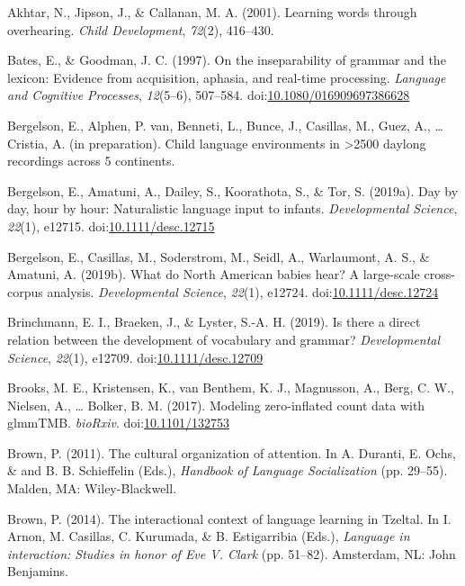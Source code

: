 \documentclass[,man,floatsintext]{apa6}
\begin{document}
\hypertarget{ref-akhtar2001learning}{}
Akhtar, N., Jipson, J., \& Callanan, M. A. (2001). Learning words
through overhearing. \emph{Child Development}, \emph{72}(2), 416--430.

\hypertarget{ref-bates1997inseparability}{}
Bates, E., \& Goodman, J. C. (1997). On the inseparability of grammar
and the lexicon: Evidence from acquisition, aphasia, and real-time
processing. \emph{Language and Cognitive Processes}, \emph{12}(5--6),
507--584.
doi:\href{https://doi.org/10.1080/016909697386628}{10.1080/016909697386628}

\hypertarget{ref-bergelsonIPbsl}{}
Bergelson, E., Alphen, P. van, Benneti, L., Bunce, J., Casillas, M.,
Guez, A., \ldots{} Cristia, A. (in preparation). Child language
environments in \textgreater{}2500 daylong recordings across 5
continents.

\hypertarget{ref-bergelson2019day}{}
Bergelson, E., Amatuni, A., Dailey, S., Koorathota, S., \& Tor, S.
(2019a). Day by day, hour by hour: Naturalistic language input to
infants. \emph{Developmental Science}, \emph{22}(1), e12715.
doi:\href{https://doi.org/10.1111/desc.12715}{10.1111/desc.12715}

\hypertarget{ref-bergelsoncasillas2019what}{}
Bergelson, E., Casillas, M., Soderstrom, M., Seidl, A., Warlaumont, A.
S., \& Amatuni, A. (2019b). What do North American babies hear? A
large-scale cross-corpus analysis. \emph{Developmental Science},
\emph{22}(1), e12724.
doi:\href{https://doi.org/10.1111/desc.12724}{10.1111/desc.12724}

\hypertarget{ref-brinchmann2019direct}{}
Brinchmann, E. I., Braeken, J., \& Lyster, S.-A. H. (2019). Is there a
direct relation between the development of vocabulary and grammar?
\emph{Developmental Science}, \emph{22}(1), e12709.
doi:\href{https://doi.org/10.1111/desc.12709}{10.1111/desc.12709}

\hypertarget{ref-brooks2017modeling}{}
Brooks, M. E., Kristensen, K., van Benthem, K. J., Magnusson, A., Berg,
C. W., Nielsen, A., \ldots{} Bolker, B. M. (2017). Modeling
zero-inflated count data with glmmTMB. \emph{bioRxiv}.
doi:\href{https://doi.org/10.1101/132753}{10.1101/132753}

\hypertarget{ref-brown2011cultural}{}
Brown, P. (2011). The cultural organization of attention. In A. Duranti,
E. Ochs, \& and B. B. Schieffelin (Eds.), \emph{Handbook of Language
Socialization} (pp. 29--55). Malden, MA: Wiley-Blackwell.

\hypertarget{ref-brown2014interactional}{}
Brown, P. (2014). The interactional context of language learning in
Tzeltal. In I. Arnon, M. Casillas, C. Kurumada, \& B. Estigarribia
(Eds.), \emph{Language in interaction: Studies in honor of Eve V. Clark}
(pp. 51--82). Amsterdam, NL: John Benjamins.
\end{document}
